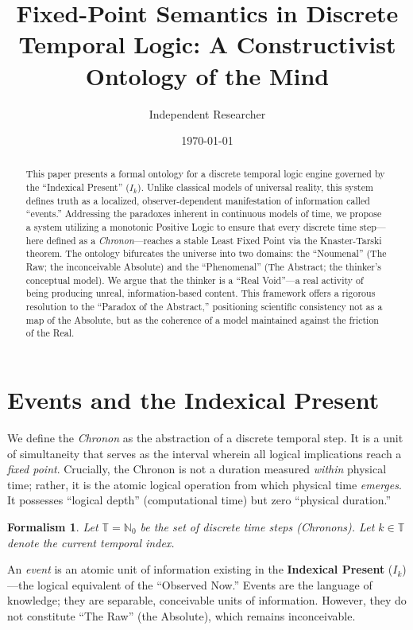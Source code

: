 \documentclass[12pt, a4paper]{article}
\title{Fixed-Point Semantics in Discrete Temporal Logic: A Constructivist Ontology of the Mind}
\author{Independent Researcher}
\date{\today}
\newtheorem{formalism}{Formalism}
\begin{document}
\maketitle

\begin{abstract}
This paper presents a formal ontology for a discrete temporal logic engine governed by the ``Indexical Present'' ($I_k$). Unlike classical models of universal reality, this system defines truth as a localized, observer-dependent manifestation of information called ``events.'' Addressing the paradoxes inherent in continuous models of time, we propose a system utilizing a monotonic Positive Logic to ensure that every discrete time step—here defined as a \textit{Chronon}—reaches a stable Least Fixed Point via the Knaster-Tarski theorem. The ontology bifurcates the universe into two domains: the ``Noumenal'' (The Raw; the inconceivable Absolute) and the ``Phenomenal'' (The Abstract; the thinker's conceptual model). We argue that the thinker is a ``Real Void''—a real activity of being producing unreal, information-based content. This framework offers a rigorous resolution to the ``Paradox of the Abstract,'' positioning scientific consistency not as a map of the Absolute, but as the coherence of a model maintained against the friction of the Real.
\end{abstract}

\section{Events and the Indexical Present}

We define the \textit{Chronon} as the abstraction of a discrete temporal step. It is a unit of simultaneity that serves as the interval wherein all logical implications reach a \textit{fixed point}. Crucially, the Chronon is not a duration measured \textit{within} physical time; rather, it is the atomic logical operation from which physical time \textit{emerges}. It possesses ``logical depth'' (computational time) but zero ``physical duration.''

\begin{formalism}
Let $\mathbb{T} = \mathbb{N}_0$ be the set of discrete time steps (Chronons).
Let $k \in \mathbb{T}$ denote the current temporal index.
\end{formalism}

An \textit{event} is an atomic unit of information existing in the \textbf{Indexical Present} ($I_k$)—the logical equivalent of the ``Observed Now.'' Events are the language of knowledge; they are separable, conceivable units of information. However, they do not constitute ``The Raw'' (the Absolute), which remains inconceivable.
\end{document}
